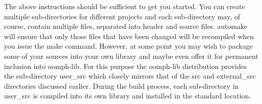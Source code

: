 The above instructions should be sufficient to get you started. You can create multiple sub-\/directories for different projects and each sub-\/directory may, of course, contain multiple files, separated into header and source files. {\ttfamily automake} will ensure that only those files that have been changed will be recompiled when you issue the {\ttfamily make} command. However, at some point you may wish to package some of your sources into your own library and maybe even offer it for permanent inclusion into {\ttfamily oomph-\/lib}. For this purpose the {\ttfamily oomph-\/lib} distribution provides the sub-\/directory {\ttfamily user\+\_\+src} which closely mirrors that of the {\ttfamily src} and {\ttfamily external\+\_\+src} directories discussed earlier. During the build process, each sub-\/directory in {\ttfamily user\+\_\+src} is compiled into its own library and installed in the standard location.

